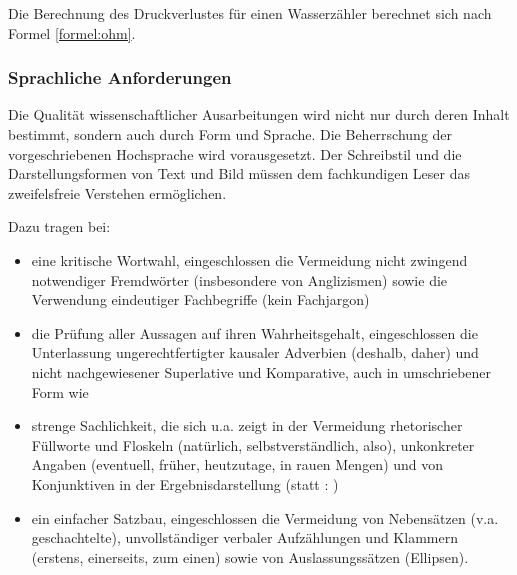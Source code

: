 Die Berechnung des Druckverlustes für einen Wasserzähler berechnet sich nach Formel \ref{formel:ohm}.



\subsubsection{Sprachliche Anforderungen}
\label{formal-gestaltung-textteil-sprache}
Die Qualität wissenschaftlicher Ausarbeitungen wird nicht nur durch deren Inhalt bestimmt, sondern auch durch Form und Sprache.
Die Beherrschung der vorgeschriebenen Hochsprache wird vorausgesetzt.
Der Schreibstil und die Darstellungsformen von Text und Bild müssen dem fachkundigen Leser das zweifelsfreie Verstehen ermöglichen.

Dazu tragen bei:
\begin{itemize}
    \item eine kritische Wortwahl, eingeschlossen die Vermeidung nicht zwingend notwendiger Fremdwörter (insbesondere von Anglizismen) sowie die Verwendung eindeutiger Fachbegriffe (kein Fachjargon)
    \item die Prüfung aller Aussagen auf ihren Wahrheitsgehalt, eingeschlossen die Unterlassung ungerechtfertigter kausaler Adverbien (deshalb, daher) und nicht nachgewiesener Superlative und Komparative, auch in umschriebener Form wie 
    \item strenge Sachlichkeit, die sich u.a. zeigt in der Vermeidung rhetorischer Füllworte und Floskeln (natürlich, selbstverständlich, also), unkonkreter Angaben (eventuell, früher, heutzutage, in rauen Mengen) und von Konjunktiven in der Ergebnisdarstellung (statt : )
    \item ein einfacher Satzbau, eingeschlossen die Vermeidung von Nebensätzen (v.a. geschachtelte), unvollständiger verbaler Aufzählungen und Klammern (erstens, einerseits, zum einen) sowie von Auslassungssätzen (Ellipsen).
\end{itemize}

